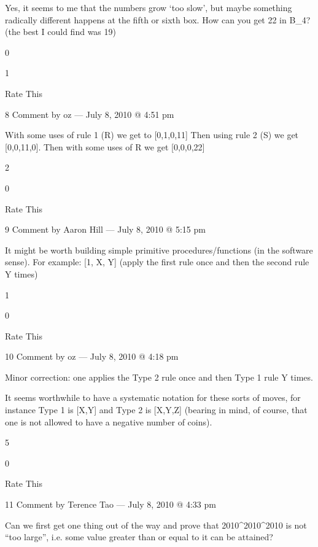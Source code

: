                 Yes, it seems to me that the numbers grow ‘too slow’, but maybe something radically different
                happens at the fifth or sixth box. How can you get 22 in B_4? (the best I could find was 19)
                 
                0
                 
                1
                 
                Rate This

                8 Comment by oz — July 8, 2010 @ 4:51 pm

                    With some uses of rule 1 (R) we get to [0,1,0,11] Then using rule 2 (S) we get [0,0,11,0]. Then with some uses of R we get [0,0,0,22]
                     
                    2
                     
                    0
                     
                    Rate This

                    9 Comment by Aaron Hill — July 8, 2010 @ 5:15 pm

    It might be worth building simple primitive procedures/functions (in the software sense). For example:
    [1, X, Y] \mapsto [0, 0, X+2Y] (apply the first rule once and then the second rule Y times)
     
    1
     
    0
     
    Rate This

    10 Comment by oz — July 8, 2010 @ 4:18 pm

        Minor correction: one applies the Type 2 rule once and then
        Type 1 rule Y times.

        It seems worthwhile to have a systematic notation for these
        sorts of moves, for instance Type 1 is [X,Y] \to [X-1,Y+2] and
        Type 2 is [X,Y,Z] \to [X-1,Z,Y] (bearing in mind, of course,
        that one is not allowed to have a negative number of coins).
         
        5
         
        0
         
        Rate This

        11 Comment by Terence Tao — July 8, 2010 @ 4:33 pm

    Can we first get one thing out of the way and prove that 2010^{2010^{2010}} is not “too large”, i.e. some value greater than or equal to it can be attained?


